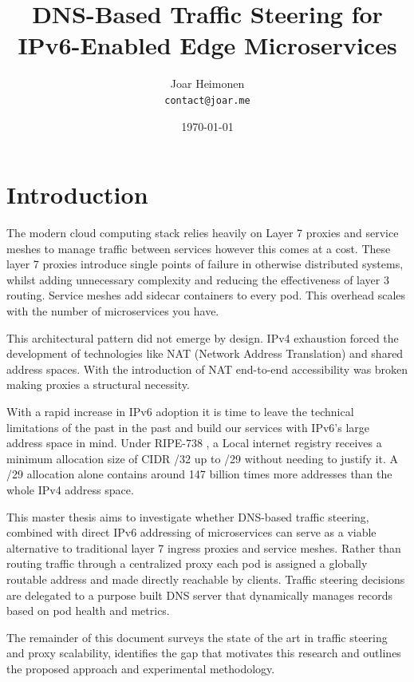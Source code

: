\documentclass[a4paper,11pt]{article}
\title{
    \textbf{DNS-Based Traffic Steering for IPv6-Enabled Edge Microservices}\\[0.5em]
}
\author{Joar Heimonen \\ \texttt{contact@joar.me}}
\date{\today}
\begin{document}
\maketitle
\tableofcontents
\newpage

\section{Introduction}
The modern cloud computing stack relies heavily on Layer 7 proxies and service meshes to manage traffic between services however
this comes at a cost. These layer 7 proxies introduce single points of failure in otherwise distributed systems, whilst adding unnecessary
complexity and reducing the effectiveness of layer 3 routing. Service meshes add sidecar containers to every pod.
This overhead scales with the number of microservices you have.

This architectural pattern did not emerge by design. IPv4 exhaustion forced the development of technologies like
NAT (Network Address Translation) and shared address spaces. With the introduction of NAT end-to-end accessibility was broken
making proxies a structural necessity.

With a rapid increase in IPv6 adoption it is time to leave the technical limitations of the past in the past
and build our services with IPv6's large address space in mind. Under RIPE-738 \cite{IPv6AddressAllocationa}, a Local internet registry receives a minimum allocation size of CIDR /32 up to /29
without needing to justify it. A /29 allocation alone contains around 147 billion times more addresses than the whole IPv4 address space.

This master thesis aims to investigate whether DNS-based traffic steering, combined with direct IPv6 addressing of microservices can serve
as a viable alternative to traditional layer 7 ingress proxies and service meshes. Rather than routing traffic through a centralized proxy
each pod is assigned a globally routable address and made directly reachable by clients.
Traffic steering decisions are delegated to a purpose built DNS server that dynamically manages records
based on pod health and metrics.

The remainder of this document surveys the state of the art in traffic steering and proxy scalability, identifies the gap that motivates this research
and outlines the proposed approach and experimental methodology.
\end{document}
